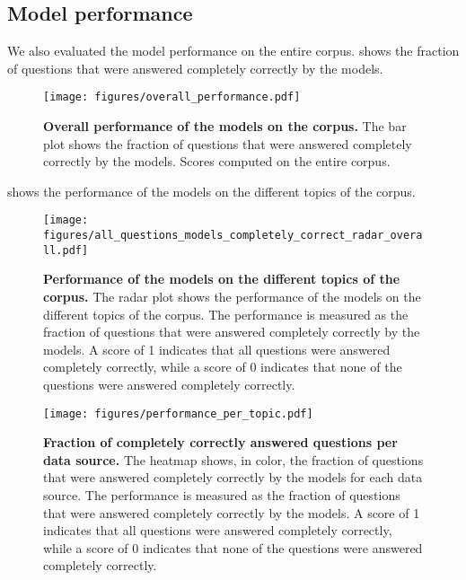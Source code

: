 

\subsection{Model performance}
We also evaluated the model performance on the entire \chembench corpus. 
 shows the fraction of questions that were answered completely correctly by the models. 

\begin{figure}[htb]
    \centering
    \texttt{[image: figures/overall\_performance.pdf]}
    \caption{\textbf{Overall performance of the models on the \chembench corpus.} The bar plot shows the fraction of questions that were answered completely correctly by the models. Scores computed on the entire \chembench corpus.}
    \label{fig:barplot_all_correct_all_questions}
\end{figure}

 shows the performance of the models on the different topics of the \chembench corpus.

\begin{figure}[htb]
    \centering
    \texttt{[image: figures/all\_questions\_models\_completely\_correct\_radar\_overall.pdf]}
    \caption{\textbf{Performance of the models on the different topics of the \chembench corpus.} The radar plot shows the performance of the models on the different topics of the \chembench corpus. The performance is measured as the fraction of questions that were answered completely correctly by the models.
    A score of 1 indicates that all questions were answered completely correctly, while a score of 0 indicates that none of the questions were answered completely correctly.
    }
    \label{fig:all_questions_models_completely_correct_radar_overall}
\end{figure}


\begin{figure}
    \centering
    \texttt{[image: figures/performance\_per\_topic.pdf]}
    \caption{\textbf{Fraction of completely correctly answered questions per data source.} The heatmap shows, in color, the fraction of questions that were answered completely correctly by the models for each data source. The performance is measured as the fraction of questions that were answered completely correctly by the models. A score of 1 indicates that all questions were answered completely correctly, while a score of 0 indicates that none of the questions were answered completely correctly.}
    \label{fig:performance_per_topic}
\end{figure}

